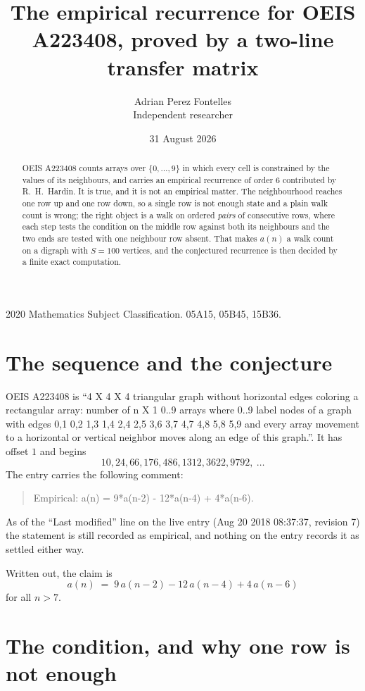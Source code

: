 \documentclass[11pt,a4paper]{article}
\title{The empirical recurrence for OEIS A223408, proved by a two-line transfer matrix}
\author{Adrian Perez Fontelles\\ \small Independent researcher}
\date{31 August 2026}
\theoremstyle{plain}
\theoremstyle{definition}
\begin{document}
\maketitle

\begin{abstract}
OEIS A223408 counts arrays over $\{0,\dots,9\}$ in which every cell is constrained by the
values of its neighbours, and carries an empirical recurrence of order $6$ contributed
by R.~H.~Hardin. It is true, and it is not an empirical matter. The neighbourhood reaches one
row up and one row down, so a single row is not enough state and a plain walk count
is wrong; the right object is a walk on ordered \emph{pairs} of consecutive rows, where
each step tests the condition on the middle row against both its neighbours and the two
ends are tested with one neighbour row absent. That makes $a(n)$ a walk count on a digraph
with $S=100$ vertices, and the conjectured recurrence is then decided by a finite exact
computation.
\end{abstract}

\noindent\small 2020 Mathematics Subject Classification. 05A15, 05B45, 15B36.\normalsize

\section{The sequence and the conjecture}

OEIS A223408 is ``4 X 4 X 4 triangular graph without horizontal edges coloring a rectangular array: number of n X 1 0..9 arrays where 0..9 label nodes of a graph with edges 0,1 0,2 1,3 1,4 2,4 2,5 3,6 3,7 4,7 4,8 5,8 5,9 and every array movement to a horizontal or vertical neighbor moves along an edge of this graph.''. It has offset $1$ and begins
\[
10, 24, 66, 176, 486, 1312, 3622, 9792,\ \dots
\]
The entry carries the following comment:
\begin{quote}\small
Empirical: a(n) = 9*a(n-2) - 12*a(n-4) + 4*a(n-6).
\end{quote}
As of the ``Last modified'' line on the live entry (Aug 20 2018 08:37:37, revision 7) the statement is
still recorded as empirical, and nothing on the entry records it as settled either way.

Written out, the claim is
\begin{equation}\label{eq:conj}
a(n)\;=\;9\,a(n-2) - 12\,a(n-4) + 4\,a(n-6)
\end{equation}
for all $n>7$.

\section{The condition, and why one row is not enough}
\end{document}
